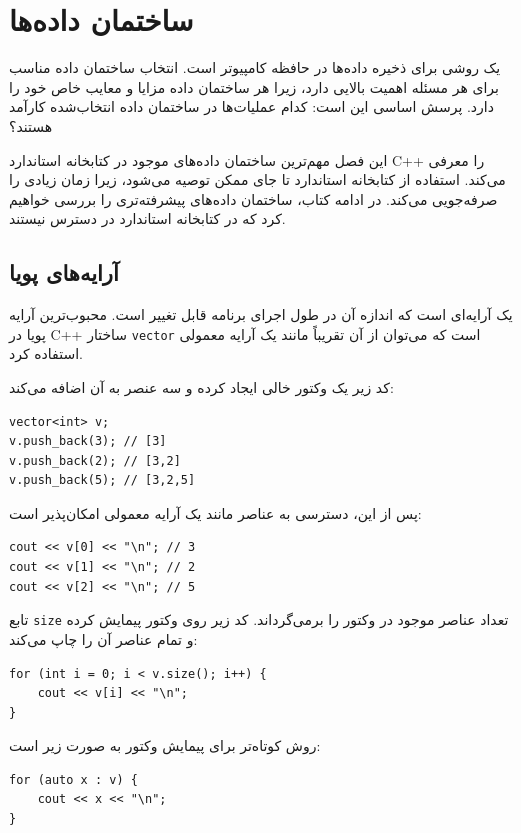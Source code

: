 \chapter{ساختمان داده‌ها}


یک  روشی برای ذخیره داده‌ها در حافظه کامپیوتر است. انتخاب ساختمان داده مناسب برای هر مسئله اهمیت بالایی دارد، زیرا هر ساختمان داده مزایا و معایب خاص خود را دارد. پرسش اساسی این است: کدام عملیات‌ها در ساختمان داده انتخاب‌شده کارآمد هستند؟

این فصل مهم‌ترین ساختمان داده‌های موجود در کتابخانه استاندارد C++ را معرفی می‌کند. استفاده از کتابخانه استاندارد تا جای ممکن توصیه می‌شود، زیرا زمان زیادی را صرفه‌جویی می‌کند. در ادامه کتاب، ساختمان داده‌های پیشرفته‌تری را بررسی خواهیم کرد که در کتابخانه استاندارد در دسترس نیستند.

\section{آرایه‌های پویا}


یک  آرایه‌ای است که اندازه آن در طول اجرای برنامه قابل تغییر است. محبوب‌ترین آرایه پویا در C++ ساختار \texttt{vector} است که می‌توان از آن تقریباً مانند یک آرایه معمولی استفاده کرد.

کد زیر یک وکتور خالی ایجاد کرده و سه عنصر به آن اضافه می‌کند:

\begin{lstlisting}
vector<int> v;
v.push_back(3); // [3]
v.push_back(2); // [3,2]
v.push_back(5); // [3,2,5]
\end{lstlisting}

پس از این، دسترسی به عناصر مانند یک آرایه معمولی امکان‌پذیر است:

\begin{lstlisting}
cout << v[0] << "\n"; // 3
cout << v[1] << "\n"; // 2
cout << v[2] << "\n"; // 5
\end{lstlisting}

تابع \texttt{size} تعداد عناصر موجود در وکتور را برمی‌گرداند. کد زیر روی وکتور پیمایش کرده و تمام عناصر آن را چاپ می‌کند:

\begin{lstlisting}
for (int i = 0; i < v.size(); i++) {
    cout << v[i] << "\n";
}
\end{lstlisting}

\begin{samepage}
روش کوتاه‌تر برای پیمایش وکتور به صورت زیر است:

\begin{lstlisting}
for (auto x : v) {
    cout << x << "\n";
}
\end{lstlisting}
\end{samepage}

